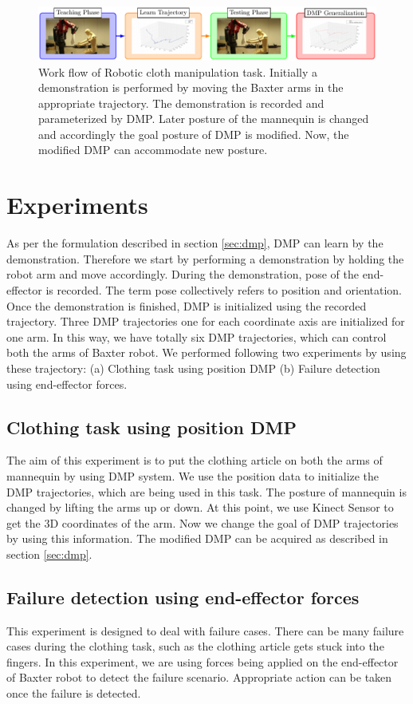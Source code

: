 \documentclass[sigconf]{acmart}
\begin{document}
\begin{figure}
	\includegraphics[width=\linewidth]{flowchart_conf}
	\caption{Work flow of Robotic cloth manipulation task. Initially a demonstration is performed by moving the Baxter arms in the appropriate trajectory. The demonstration is recorded and parameterized by DMP. Later posture of the mannequin is changed and accordingly the goal posture of DMP is modified. Now, the modified DMP can accommodate new posture.}
	\label{fig:workflow}
\end{figure}

\section{Experiments}
\label{sec:experiments}
As per the formulation described in section \ref{sec:dmp}, DMP can learn by the demonstration. Therefore we start by performing a demonstration by holding the robot arm and move accordingly. During the demonstration, pose of the end-effector is recorded. The term pose collectively refers to position and orientation. Once the demonstration is finished, DMP is initialized using the recorded trajectory. Three DMP trajectories one for each coordinate axis are initialized for one arm. In this way, we have totally six DMP trajectories, which can control both the arms of Baxter robot. We performed following two experiments by using these trajectory: (a) Clothing task using position DMP (b) Failure detection using end-effector forces.

\subsection{Clothing task using position DMP}
The aim of this experiment is to put the clothing article on both the arms of mannequin by using DMP system. We use the position data to initialize the DMP trajectories, which are being used in this task. The posture of mannequin is changed by lifting the arms up or down. At this point, we use Kinect Sensor to get the 3D coordinates of the arm. Now we change the goal of DMP trajectories by using this information. The modified DMP can be acquired as described in section \ref{sec:dmp}.

\subsection{Failure detection using end-effector forces}
This experiment is designed to deal with failure cases. There can be many failure cases during the clothing task, such as the clothing article gets stuck into the fingers. In this experiment, we are using forces being applied on the end-effector of Baxter robot to detect the failure scenario. Appropriate action can be taken once the failure is detected.
\end{document}
